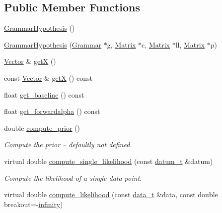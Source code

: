 \subsection*{Public Member Functions}
\begin{DoxyCompactItemize}
\item 
\hyperlink{class_grammar_hypothesis_a4b5a2b3de673582899de12c773c5e8b7}{Grammar\+Hypothesis} ()
\item 
\hyperlink{class_grammar_hypothesis_aef570b3ee4d74cb98ab9db5089fc901c}{Grammar\+Hypothesis} (\hyperlink{class_grammar}{Grammar} $\ast$g, \hyperlink{_eigen_numerics_8h_a645222978e81acfb2523a9bce34aecc0}{Matrix} $\ast$c, \hyperlink{_eigen_numerics_8h_a645222978e81acfb2523a9bce34aecc0}{Matrix} $\ast$ll, \hyperlink{_eigen_numerics_8h_a645222978e81acfb2523a9bce34aecc0}{Matrix} $\ast$p)
\item 
\hyperlink{_eigen_numerics_8h_aca2956bc379bce2ed88ab3c0e1b61d1d}{Vector} \& \hyperlink{class_grammar_hypothesis_aaf8a752657674c7b3b494f3422e7bfc1}{getX} ()
\item 
const \hyperlink{_eigen_numerics_8h_aca2956bc379bce2ed88ab3c0e1b61d1d}{Vector} \& \hyperlink{class_grammar_hypothesis_a6206300d969df15d9d38a899e5123387}{getX} () const
\item 
float \hyperlink{class_grammar_hypothesis_a3f86d5e2ab9a801e5cce7a0ada8cfc1d}{get\+\_\+baseline} () const
\item 
float \hyperlink{class_grammar_hypothesis_aaad31cff6237040d890bb4f6bf1b0bb6}{get\+\_\+forwardalpha} () const
\item 
double \hyperlink{class_grammar_hypothesis_a36c0ec17fb79f56fb4c71ed58f2625f6}{compute\+\_\+prior} ()
\begin{DoxyCompactList}\small\item\em Compute the prior -- defaultly not defined. \end{DoxyCompactList}\item 
virtual double \hyperlink{class_grammar_hypothesis_ad8e5300800646a0c0af9a0f7d0b86422}{compute\+\_\+single\+\_\+likelihood} (const \hyperlink{class_bayesable_a9f1a6c0cd7855550fa10b1a8f13a5867}{datum\+\_\+t} \&datum)
\begin{DoxyCompactList}\small\item\em Compute the likelihood of a single data point. \end{DoxyCompactList}\item 
virtual double \hyperlink{class_grammar_hypothesis_a35008279d3455087b7ea541f3259becb}{compute\+\_\+likelihood} (const \hyperlink{class_bayesable_aa2788c4d7718c0a824e1d28c4c98f921}{data\+\_\+t} \&data, const double breakout=-\/\hyperlink{_numerics_8h_a1bb1e42ae1b40cad6e99da0aab8a5576}{infinity})

\end{DoxyCompactItemize}
